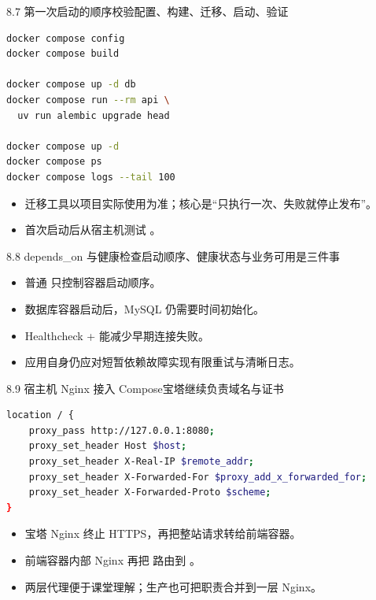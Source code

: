 \begin{frame}[fragile]{8.7 第一次启动的顺序}{校验配置、构建、迁移、启动、验证}
  \begin{lstlisting}[language=bash]
docker compose config
docker compose build

docker compose up -d db
docker compose run --rm api \
  uv run alembic upgrade head

docker compose up -d
docker compose ps
docker compose logs --tail 100
  \end{lstlisting}
  \begin{itemize}
    \item 迁移工具以项目实际使用为准；核心是“只执行一次、失败就停止发布”。
    \item 首次启动后从宿主机测试 。
  \end{itemize}
\end{frame}

\begin{frame}{8.8 depends\_on 与健康检查}{启动顺序、健康状态与业务可用是三件事}
  \begin{itemize}
    \item 普通  只控制容器启动顺序。
    \item 数据库容器启动后，MySQL 仍需要时间初始化。
    \item Healthcheck +  能减少早期连接失败。
    \item 应用自身仍应对短暂依赖故障实现有限重试与清晰日志。
  \end{itemize}
\end{frame}

\begin{frame}[fragile]{8.9 宿主机 Nginx 接入 Compose}{宝塔继续负责域名与证书}
  \begin{lstlisting}[language=bash]
location / {
    proxy_pass http://127.0.0.1:8080;
    proxy_set_header Host $host;
    proxy_set_header X-Real-IP $remote_addr;
    proxy_set_header X-Forwarded-For $proxy_add_x_forwarded_for;
    proxy_set_header X-Forwarded-Proto $scheme;
}
  \end{lstlisting}
  \begin{itemize}
    \item 宝塔 Nginx 终止 HTTPS，再把整站请求转给前端容器。
    \item 前端容器内部 Nginx 再把  路由到 。
    \item 两层代理便于课堂理解；生产也可把职责合并到一层 Nginx。
  \end{itemize}
\end{frame}

